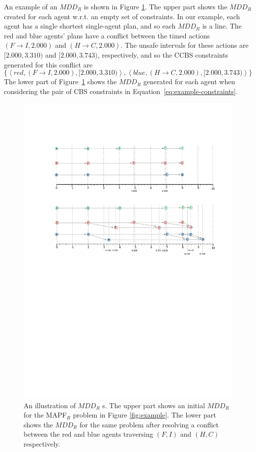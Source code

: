 \documentclass[review]{elsarticle}
\newcommand{\tuple}[1]{\ensuremath{\left \langle #1 \right \rangle }}
\newcommand{\mddr}{\ensuremath{MDD_R}\xspace}
\newcommand{\ccbs}{\ac{CCBS}\xspace}
\newcommand{\cbs}{\ac{CBS}\xspace}
\newcommand{\mapfr}{\ac{MAPF}$_R$\xspace}
\begin{document}
An example of an \mddr is shown in Figure \ref{fig:mddr}. The upper part shows the \mddr created for each agent w.r.t. an empty set of constraints. 
In our example, each agent has a single shortest single-agent plan, and so each \mddr is a line. 
The red and blue agents' plans have a conflict between the timed actions $(F\rightarrow I, 2.000)$ and $(H \rightarrow C, 2.000)$. 
The unsafe intervals for these actions are $[2.000,3.310)$ and $[2.000,3.743)$, respectively, and so the \ccbs constraints generated for this conflict are
\begin{equation}
    \{ \tuple{red, (F\rightarrow I, 2.000), [2.000,3.310)}, 
    \tuple{blue, (H\rightarrow C, 2.000), [2.000,3.743)} \}
    \label{eq:example-constraints}
\end{equation}
The lower part of Figure~\ref{fig:mddr} shows the \mddr generated for each agent when considering the pair of \cbs constraints in Equation~\ref{eq:example-constraints}.

\begin{figure}
    \centering
    \includegraphics[trim={3.0cm 14.0cm 1.0cm 4.3cm},clip,width=\columnwidth]{fig-running_makespan.pdf}
    \caption{An illustration of \mddr s. 
    The upper part shows an initial \mddr for the \mapfr problem in Figure \ref{fig:example}. The lower part shows the \mddr for the same problem after resolving a conflict between the red and blue agents traversing $(F,I)$ and $(H,C)$ respectively.}
    \label{fig:mddr}
\end{figure}
\end{document}
